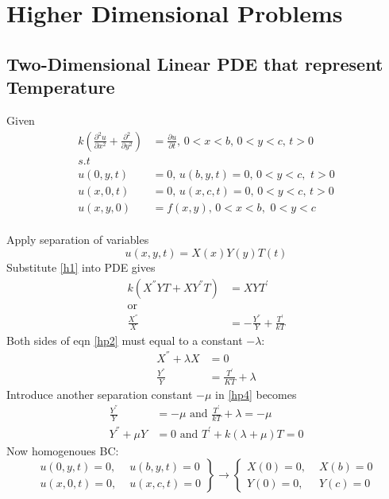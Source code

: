 \chapter{Higher Dimensional Problems}
\section{Two-Dimensional Linear PDE that represent Temperature}
Given 
\begin{align*}
k\left(\frac{\partial^2u }{\partial x^2}+\frac{\partial^2}{\partial y^2}\right)&=\frac{\partial u}{\partial t},\,0<x<b,\,0<y<c, \,t>0\\
s.t\hspace{2cm}&\\
u(0,y,t)&=0,\,u(b,y,t)=0,\,0<y<c,\,\,t>0\\
u(x,0,t)&=0,\,u(x,c,t)=0,\,0<y<c,\,t>0\\
u(x,y,0)&=f(x,y),\,0<x<b,\,\,0<y<c
\end{align*}
\\
Apply separation of variables 
\begin{equation}
u(x,y,t)=X(x)Y(y)T(t)\label{hp1}
\end{equation}
Substitute \eqref{h1} into PDE gives
\begin{align}
k(X^{''}YT+XY^{''}T)&=XYT^{'}\nonumber\\
\text{or}\hspace{2cm}&\nonumber\\
\frac{X^{''}}{X}&=-\frac{Y^{''}}{Y}+\frac{T^{'}}{kT}\label{hp2}
\end{align}
Both sides of eqn \eqref{hp2} must equal to a constant $-\lambda$:
\begin{align}
X^{''}+\lambda X&=0\label{hp3}\\
\frac{Y^{''}}{Y}&=\frac{T^{'}}{KT}+\lambda\label{hp4}
\end{align}
Introduce another separation constant $-\mu$ in \eqref{hp4} becomes
\begin{align}
\frac{Y^{''}}{Y}&=-\mu\,\,\text{and}\,\,\frac{T^{'}}{kT}+\lambda=-\mu\nonumber\\
Y^{''}+\mu Y&=0\,\,\text{and}\,\,T^{'}+k(\lambda+\mu)T=0\label{hp6}
\end{align}
Now homogenoues BC:
\begin{displaymath}
\left.\begin{array}{cc}
u(0,y,t)=0,&\,\,u(b,y,t)=0\\
u(x,0,t)=0,&\,\,u(x,c,t)=0
\end{array}\right\}\rightarrow \left\{\begin{array}{cc}
X(0)=0,&\,\,X(b)=0\\
Y(0)=0,&\,\,Y(c)=0
\end{array}\right.
\end{displaymath}
